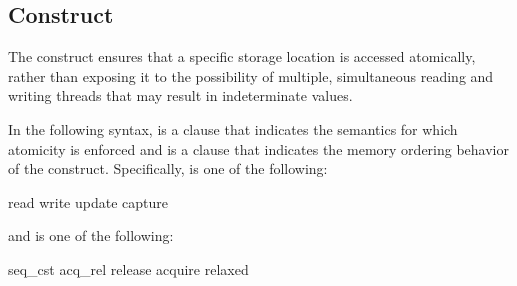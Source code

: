 \subsection{ Construct}
\label{subsec:atomic Construct}
\summary
The  construct ensures that a specific storage location is accessed atomically,
rather than exposing it to the possibility of multiple, simultaneous reading and writing
threads that may result in indeterminate values.

\syntax
In the following syntax,  is a clause that indicates
the semantics for which atomicity is enforced and  is
a clause that indicates the memory ordering behavior of the construct.
Specifically,  is one of the following:

\begin{indentedcodelist}
read
write
update
capture
\end{indentedcodelist}

and  is one of the following:

\begin{indentedcodelist}
seq_cst
acq_rel
release
acquire
relaxed
\end{indentedcodelist}

